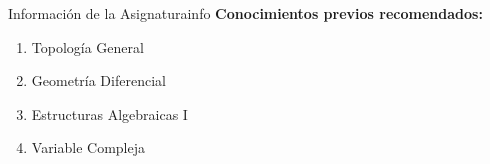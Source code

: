 
\begin{nota}{Información de la Asignatura}{info}
\textbf{Conocimientos previos recomendados:}
\begin{enumerate}
    \item Topología General
    \item Geometría Diferencial
    \item Estructuras Algebraicas I
    \item Variable Compleja
\end{enumerate}
\end{nota}